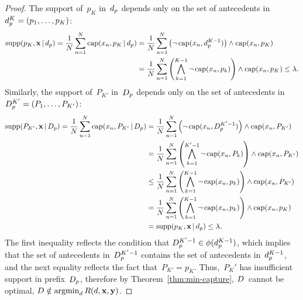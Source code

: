\begin{arxiv}
\begin{proof}
The support of~$p_K$ in~$d_p$ depends only on the
set of antecedents in ${d_p^{K} = (p_1, \dots, p_{K})}$:
\begin{align}
\Supp(p_K, \x \given \Prefix)
= \frac{1}{N} \sum_{n=1}^N \Cap(x_n, p_K \given \Prefix)
&= \frac{1}{N} \sum_{n=1}^N \left( \neg\, \Cap(x_n, \Prefix^{K-1}) \right)
  \wedge \Cap(x_n, p_K) \nn \\
&= \frac{1}{N} \sum_{n=1}^N \left( \bigwedge_{k=1}^{K-1} \neg\, \Cap(x_n, p_k) \right)
  \wedge \Cap(x_n, p_K)
\le \Reg.
\end{align}
Similarly, the support of~$P_{K'}$ in~$D_p$ depends only on
the set of antecedents in ${D_p^{K'} = (P_1, \dots, P_{K'})}$:
\begin{align}
\Supp(P_{K'}, \x \given \PrefixB)
= \frac{1}{N} \sum_{n=1}^N \Cap(x_n, P_{K'} \given \PrefixB)
&= \frac{1}{N} \sum_{n=1}^N \left( \neg\, \Cap(x_n, \PrefixB^{K'-1}) \right)
  \wedge \Cap(x_n, P_{K'}) \nn \\
&= \frac{1}{N} \sum_{n=1}^N \left( \bigwedge_{k=1}^{K'-1} \neg\, \Cap(x_n, P_k) \right)
   \wedge \Cap(x_n, P_{K'}) \nn \\
&\le \frac{1}{N} \sum_{n=1}^N \left( \bigwedge_{k=1}^{K-1} \neg\, \Cap(x_n, p_k) \right)
  \wedge \Cap(x_n, P_{K'}) \nn \\
&= \frac{1}{N} \sum_{n=1}^N \left( \bigwedge_{k=1}^{K-1} \neg\, \Cap(x_n, p_k) \right)
  \wedge \Cap(x_n, p_{K}) \nn \\
&= \Supp(p_K, \x \given \Prefix) \le \Reg.
\label{ineq:supp}
\end{align}
The first inequality reflects the condition that
${D_p^{K'-1} \in \phi(d_p^{K-1})}$,
which implies that the set of antecedents in~$D_p^{K'-1}$
contains the set of antecedents in~$d_p^{K-1}$,
and the next equality reflects the fact that~${P_{K'} = p_K}$.
%
Thus,~$P_K'$ has insufficient support in prefix~$D_p$,
therefore by Theorem~\ref{thm:min-capture}, ${D}$~cannot be optimal,
\ie ${{D} \notin \operatorname*{argmin}_{{d}} R({d}, \mathbf{x}, \mathbf{y})}$.
\end{proof}


\end{arxiv}
